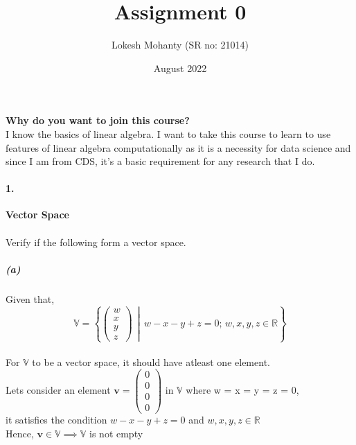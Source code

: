 \documentclass[12pt, letterpaper]{article}
\title{Assignment 0}
\author{Lokesh Mohanty (SR no: 21014)}
\date{August 2022}
\begin{document}
\maketitle

\textbf{Why do you want to join this course?}\\
I know the basics of linear algebra. I want to take this course to learn to use features of linear algebra computationally as it is a necessity for data science and since I am from CDS, it's a basic requirement for any research that I do.


\paragraph{1.} \textbf{Vector Space}\\\\
Verify if the following form a vector space.

\subparagraph{(a)} Given that,
\begin{equation}
  \label{1a}
  \mathbb{V} =
  \left\{
  \begin{pmatrix}w \\ x \\ y \\ z\end{pmatrix} \, \middle| \, w-x-y+z = 0; \, w,x,y,z \in \mathbb{R} 
    \right\}
\end{equation}\\

For $\mathbb{V}$ to be a vector space, it should have atleast one element.\\
Lets consider an element
$\mathbf{v} = \begin{pmatrix}0\\0\\0\\0\end{pmatrix}$ in
$\mathbb{V}$ where w = x = y = z = 0,\\
it satisfies the condition $w - x - y + z = 0$ and $w,x,y,z \in\mathbb{R}$\\
Hence, $\mathbf{v}\in\mathbb{V} \implies \mathbb{V}$ is not empty\\
\end{document}
